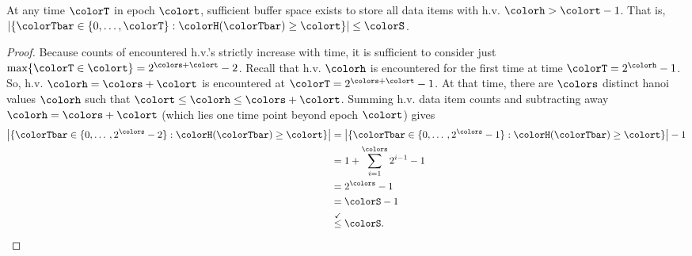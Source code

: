 \begin{lemma} \label{thm:steady-hv-geq-epoch}

At any time $\colorT$ in epoch $\colort$, sufficient buffer space exists to store all data items with h.v. $\colorh > \colort - 1$.
That is, $\left| \{\colorTbar \in \{0, \ldots, \colorT \} : \colorH(\colorTbar) \geq \colort \} \right| \leq \colorS$.
\end{lemma}

\begin{proof}
Because counts of encountered h.v.'s strictly increase with time, it is sufficient to consider just $\max\{\colorT \in \colort\} = 2^{\colors + \colort} - 2$.
Recall that h.v. $\colorh$ is encountered for the first time at time $\colorT = 2^{\colorh} - 1$.
So, h.v. $\colorh = \colors + \colort$ is encountered at $\colorT = 2^{\colors + \colort} - 1$.
At that time, there are $\colors$ distinct hanoi values $\colorh$ such that $\colort \leq \colorh \leq \colors + \colort$.
Summing h.v. data item counts and subtracting away $\colorh = \colors + \colort$ (which lies one time point beyond epoch $\colort$) gives
\begin{align*}
\left| \{\colorTbar \in \{0, \ldots\, , 2^{\colors} - 2 \} : \colorH(\colorTbar) \geq \colort \} \right|
&= \left| \{\colorTbar \in \{0, \ldots \, , 2^{\colors} - 1 \} : \colorH(\colorTbar) \geq \colort \} \right| - 1\\
&= 1 + \sum_{i=1}^{\colors} 2^{i - 1} - 1 \\
&= 2^{\colors} - 1 \\
&= \colorS - 1\\
&\stackrel{\checkmark}{\leq} \colorS.
\end{align*}
\end{proof}
